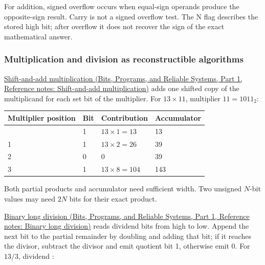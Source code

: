 For addition, signed overflow occurs when equal-sign operands produce the opposite-sign result. Carry is not a signed overflow test. The N flag describes the stored high bit; after overflow it does not recover the sign of the exact mathematical answer.

\subsubsection{Multiplication and division as reconstructible algorithms}\label{05-engine-i-ch001-multiplication-and-division-as-reconstructible-algorithms}

\hypertarget{05-engine-i-ch001-multiplication-and-division-as-reconstructible-algorithms}{}

\href{../01-Bits-Programs-and-Reliable-Systems-P01/main.pdf\#nameddest=appendix-a65290d66ed9}{Shift-and-add multiplication (Bits, Programs, and Reliable Systems, Part 1, Reference notes: Shift-and-add multiplication)} adds one shifted copy of the multiplicand for each set bit of the multiplier. For \(13\times11\), multiplier \(11=1011_2\):

{\def\LTcaptype{none} %
\begin{longtable}[]{@{}llll@{}}
\toprule\noalign{}
Multiplier position & Bit & Contribution & Accumulator \\
\midrule\noalign{}
\endhead
\bottomrule\noalign{}
\endlastfoot
0 & 1 & \(13\times1=13\) & 13 \\
1 & 1 & \(13\times2=26\) & 39 \\
2 & 0 & 0 & 39 \\
3 & 1 & \(13\times8=104\) & 143 \\
\end{longtable}
}

Both partial products and accumulator need sufficient width. Two unsigned \(N\)-bit values may need \(2N\) bits for their exact product.

\href{../01-Bits-Programs-and-Reliable-Systems-P01/main.pdf\#nameddest=appendix-89985e6a2685}{Binary long division (Bits, Programs, and Reliable Systems, Part 1, Reference notes: Binary long division)} reads dividend bits from high to low. Append the next bit to the partial remainder by doubling and adding that bit; if it reaches the divisor, subtract the divisor and emit quotient bit 1, otherwise emit 0. For \(13/3\), dividend :

